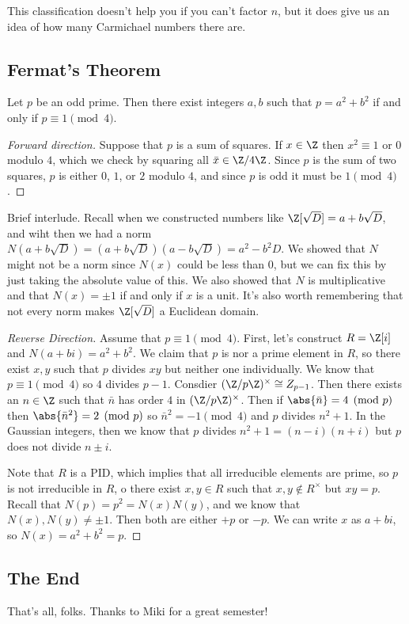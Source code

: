 This classification doesn't help you if you can't factor $n$, but it does give us an idea of how many Carmichael numbers there are.

\subsection{Fermat's Theorem}

\begin{theorem}
Let $p$ be an odd prime. Then there exist integers $a,b$ such that $p = a^2 + b^2$ if and only if $p \equiv 1 \pmod{4}$.
\end{theorem}

\begin{proof}[Forward direction]
Suppose that $p$ is a sum of squares. If $x \in \Z$ then $x^2 \equiv 1$ or $0$ modulo $4$, which we check by squaring all $\bar{x} \in \Z/4\Z$. Since $p$ is the sum of two squares, $p$ is either $0$, $1$, or $2$ modulo $4$, and since $p$ is odd it must be $1 \pmod{4}$.
\end{proof}

Brief interlude. Recall when we constructed numbers like $\Z[\sqrt{D}] = a + b\sqrt{D}$, and wiht then we had a norm $N(a + b\sqrt{D}) = (a + b\sqrt{D})(a - b\sqrt{D}) = a^2-b^2D$. We showed that $N$ might not be a norm since $N(x)$ could be less than $0$, but we can fix this by just taking the absolute value of this. We also showed that $N$ is multiplicative and that $N(x) = \pm 1$ if and only if $x$ is a unit. It's also worth remembering that not every norm makes $\Z[\sqrt{D}]$ a Euclidean domain.

\begin{proof}[Reverse Direction]
Assume that $p \equiv 1 \pmod{4}$. First, let's construct $R = \Z[i]$ and $N(a+bi) = a^2 + b^2$. We claim that $p$ is nor a prime element in $R$, so there exist $x,y$ such that $p$ divides $xy$ but neither one individually. We know that $p \equiv 1 \pmod{4}$ so $4$ divides $p-1$. Consdier $(\Z/p\Z)^\times \cong Z_{p-1}$. Then there exists an $n \in \Z$ such that $\bar{n}$ has order $4$ in $(\Z/p\Z)^\times$. Then if $\abs{\bar{n}} = 4 \pmod{p}$ then $\abs{\bar{n}^2} = 2 \pmod{p}$ so $\bar{n}^2 = -1 \pmod{4}$ and $p$ divides $n^2 + 1$. In the Gaussian integers, then we know that $p$ divides $n^2 + 1 = (n-i)(n+i)$ but $p$ does not divide $n \pm i$.

Note that $R$ is a PID, which implies that all irreducible elements are prime, so $p$ is not irreducible in $R$, o there exist $x,y \in R$ such that $x,y \notin R^\times$ but $xy = p$. Recall that $N(p) = p^2 = N(x)N(y)$, and we know that $N(x),N(y) \not= \pm 1$. Then both are either $+p$ or $-p$. We can write $x$ as $a+bi$, so $N(x) = a^2 + b^2 = p$.
\end{proof}

\subsection{The End}

That's all, folks. Thanks to Miki for a great semester!